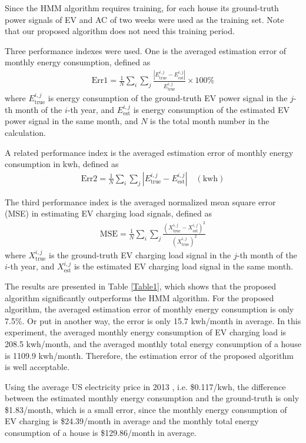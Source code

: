 \documentclass[conference]{IEEEtran}
\begin{document}
Since the HMM algorithm requires training, for each house its ground-truth power signals of EV and AC of two weeks were used as the training set. Note that our proposed algorithm does not need this training period.


Three performance indexes were used. One is the averaged estimation error of monthly energy consumption, defined as
\begin{eqnarray}
\mathrm{Err1} =  \frac{1}{N}\sum_{i}\sum_{j} \frac{|E^{i,j}_{\mathrm{true}} - E^{i,j}_{\mathrm{est}}|}{E^{i,j}_{\mathrm{true}}} \times 100\%
\end{eqnarray}
where $E^{i,j}_{\mathrm{true}}$ is energy consumption of the ground-truth EV power signal in the $j$-th month of the $i$-th year, and $E^{i,j}_{\mathrm{est}}$ is energy consumption of the estimated EV power signal in the same month, and $N$ is the total month number in the calculation.

A related performance index is the averaged estimation error of monthly energy consumption in kwh, defined as
\begin{eqnarray}
\mathrm{Err2} =  \frac{1}{N}\sum_{i}\sum_{j} |E^{i,j}_{\mathrm{true}} - E^{i,j}_{\mathrm{est}}| \quad (\mathrm{kwh})
\end{eqnarray}


The third performance index is the averaged normalized mean square error (MSE) in estimating EV charging load signals, defined as
\begin{eqnarray}
\mathrm{MSE} = \frac{1}{N}\sum_{i}\sum_{j} \frac{(X^{i,j}_{\mathrm{true}} - X^{i,j}_{\mathrm{est}})^2}{(X^{i,j}_{\mathrm{true}})^2}
\end{eqnarray}
where $X^{i,j}_{\mathrm{true}}$ is the ground-truth EV charging load signal in the $j$-th month of the $i$-th year, and $X^{i,j}_{\mathrm{est}}$ is the estimated EV charging load signal in the same month.

The results are presented in Table \ref{Table1}, which shows that the proposed algorithm significantly outperforms the HMM algorithm. For the proposed algorithm, the averaged estimation error of monthly energy consumption is only 7.5\%. Or put in another way, the error is only 15.7 kwh/month in average. In this experiment, the averaged monthly energy consumption of EV charging load is 208.5 kwh/month, and the averaged monthly total energy consumption of a house is 1109.9 kwh/month. Therefore, the estimation error of the proposed algorithm is well acceptable.

Using the average US electricity price in 2013 \cite{price}, i.e. \$0.117/kwh, the difference between the estimated monthly energy consumption and the ground-truth is only \$1.83/month, which is a small error, since the monthly energy consumption of EV charging is \$24.39/month in average and the monthly total energy consumption of a house is \$129.86/month in average.
\end{document}
